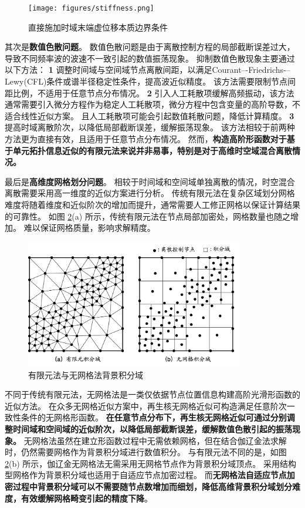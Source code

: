 \begin{figure}[!h]
    \centering 
    \texttt{[image: figures/stiffness.png]}
    \caption{直接施加时域末端虚位移本质边界条件}
    \label{fg:direct}
\end{figure}

其次是\textbf{数值色散问题}。
数值色散问题是由于离散控制方程的局部截断误差过大，导致不同频率波的波速不一致引起的数值振荡现象\cite{zhang2024}。
抑制数值色散现象主要通过以下方法：
\textcircled{\textbf{\small 1}}
调整时间域与空间域节点离散间距，以满足Courant–-Friedrichs-–Lewy(CFL)条件或谱半径稳定性条件，提高波近似精度。
该方法需要限制节点间距比例，不适用于任意节点分布情况。
\textcircled{\textbf{\small 2}}
引入人工耗散项缓解高频振动，该方法通常需要引入微分方程作为稳定人工耗散项，微分方程中包含变量的高阶导数，不适合线性近似方案。
且人工耗散项可能会引起数值耗散问题，降低计算精度。
\textcircled{\textbf{\small 3}}
提高时域离散阶次，以降低局部截断误差，缓解振荡现象。
该方法相较于前两种方法更为直接有效，且适用于任意节点分布情况。
然而，\textbf{构造高阶形函数对于基于单元拓扑信息近似的有限元法来说并非易事，特别是对于高维时空域混合离散情况。}

最后是\textbf{高维度网格划分问题}。
相较于时间域和空间域单独离散的情况，时空混合离散需要采用高一维度的近似方案进行分析。
传统有限元法在复杂区域划分网格难度将随着维度和近似阶次的增加而提升，通常需要人工修正网格以保证计算结果的可靠性。
如图 \ref{fg:cell}(a) 所示，传统有限元法在节点局部加密处，网格数量也随之增加。
难以保证网格质量，影响求解精度。

\begin{figure}[!h]
    \centering 
    \includegraphics[width=0.85\textwidth]{figures/cell.png}
    \caption{有限元法与无网格法背景积分域}
    \label{fg:cell}
\end{figure}

不同于传统有限元法，无网格法\cite{Zhang2004a}是一类仅依据节点位置信息构建高阶光滑形函数的近似方法。
在众多无网格近似方案中，再生核无网格近似可构造满足任意阶次一致性条件的无网格形函数。
\textbf{在任意节点分布下，再生核无网格近似可通过分别调整时间域和空间域的近似阶次，以降低局部截断误差，缓解数值色散引起的振荡现象。}
无网格法虽然在建立形函数过程中无需依赖网格，但在结合伽辽金法求解时，仍然需要网格作为背景积分域进行数值积分。
与有限元法不同的是，如图 \ref{fg:cell}(b) 所示，伽辽金无网格法无需采用无网格节点作为背景积分域顶点。
采用结构型网格作为背景积分域也适用于自适应节点加密过程。
而\textbf{无网格法自适应节点加密过程中背景积分域可以不需要随节点数增加而细划，降低高维背景积分域划分难度，有效缓解网格畸变引起的精度下降}。

